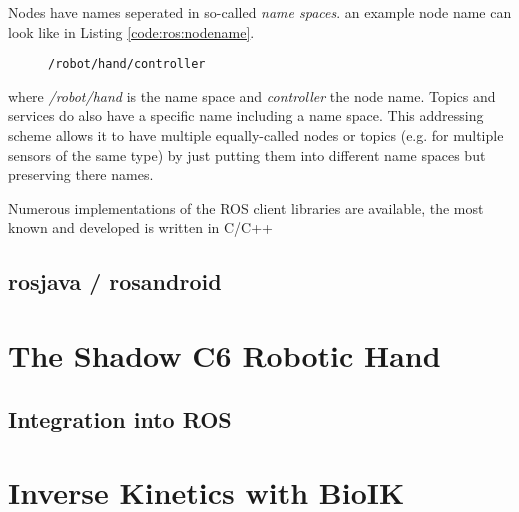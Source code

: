 Nodes have names seperated in so-called \textit{name spaces}. an example node name can look like in Listing \ref{code:ros:nodename}.
\begin{figure}
	\begin{lstlisting}[caption={An example ROS node name},label=code:ros:nodename]
	/robot/hand/controller
	\end{lstlisting}
\end{figure}

where \textit{/robot/hand} is the name space and \textit{controller} the node name. Topics and services do also have a specific name including a name space. This addressing scheme allows it to have multiple equally-called nodes or topics (e.g. for multiple sensors of the same type) by just putting them into different name spaces but preserving there names.

Numerous implementations of the ROS client libraries are available, the most known and developed is written in C/C++

\subsection{rosjava / rosandroid}

\section{The Shadow C6 Robotic Hand}
\subsection{Integration into ROS}

\section{Inverse Kinetics with BioIK}